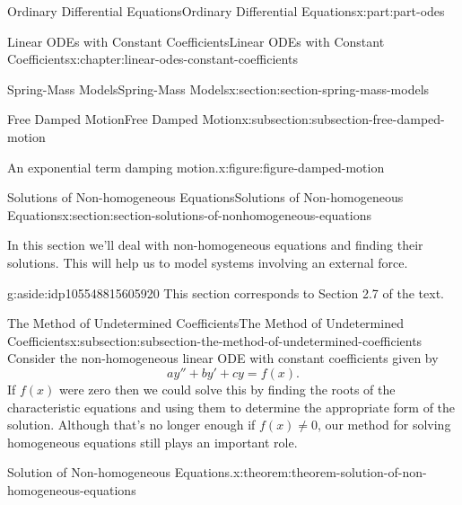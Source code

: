 \documentclass[twoside,10pt,]{book}
\numberwithin{equation}{part}
\begin{document}
\begin{partptx}{Ordinary Differential Equations}{}{Ordinary Differential Equations}{}{}{x:part:part-odes}
\begin{chapterptx}{Linear ODEs with Constant Coefficients}{}{Linear ODEs with Constant Coefficients}{}{}{x:chapter:linear-odes-constant-coefficients}
\begin{sectionptx}{Spring-Mass Models}{}{Spring-Mass Models}{}{}{x:section:section-spring-mass-models}
\begin{subsectionptx}{Free Damped Motion}{}{Free Damped Motion}{}{}{x:subsection:subsection-free-damped-motion}
\begin{figureptx}{An exponential term damping motion.}{x:figure:figure-damped-motion}{}
\begin{image}{0.25}{0.5}{0.25}
{
}%
\end{image}%
\tcblower
\end{figureptx}%
\end{subsectionptx}
\end{sectionptx}
%
%
\typeout{************************************************}
\typeout{************************************************}
%
\begin{sectionptx}{Solutions of Non-homogeneous Equations}{}{Solutions of Non-homogeneous Equations}{}{}{x:section:section-solutions-of-nonhomogeneous-equations}
\begin{introduction}{}%
In this section we'll deal with non-homogeneous equations and finding their solutions. This will help us to model systems involving an external force.%
\begin{aside}{}{g:aside:idp105548815605920}%
This section corresponds to Section 2.7 of the text.%
\end{aside}
\end{introduction}%
%
%
\typeout{************************************************}
\typeout{************************************************}
%
\begin{subsectionptx}{The Method of Undetermined Coefficients}{}{The Method of Undetermined Coefficients}{}{}{x:subsection:subsection-the-method-of-undetermined-coefficients}
Consider the non-homogeneous linear ODE with constant coefficients given by%
\begin{equation}
ay'' + by' + cy = f(x).\label{x:men:equation-non-homogeneous}
\end{equation}
If \(f(x)\) were zero then we could solve this by finding the roots of the characteristic equations and using them to determine the appropriate form of the solution. Although that's no longer enough if \(f(x)\neq0\), our method for solving homogeneous equations still plays an important role.%
\begin{theorem}{Solution of Non-homogeneous Equations.}{}{x:theorem:theorem-solution-of-non-homogeneous-equations}%

\end{theorem}
\end{subsectionptx}
\end{sectionptx}
\end{chapterptx}
\end{partptx}
\end{document}
